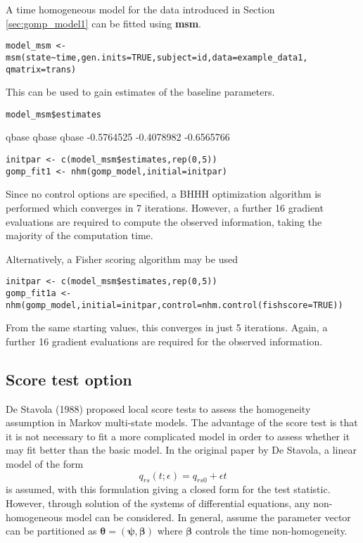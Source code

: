 \documentclass{article}
\numberwithin{equation}{section}
\begin{document}
A time homogeneous model for the data introduced in Section \ref{sec:gomp_model1} can be fitted using {\bf msm}.

\begin{verbatim}
model_msm <- msm(state~time,gen.inits=TRUE,subject=id,data=example_data1,
qmatrix=trans)
\end{verbatim}
This can be used to gain estimates of the baseline parameters.
\begin{verbatim}
model_msm$estimates
\end{verbatim}
\begin{verbout}
     qbase      qbase      qbase
-0.5764525 -0.4078982 -0.6565766
\end{verbout}

\begin{verbatim}
initpar <- c(model_msm$estimates,rep(0,5))
gomp_fit1 <- nhm(gomp_model,initial=initpar)
\end{verbatim}
Since no control options are specified, a BHHH optimization algorithm is performed which converges in 7 iterations. However, a further 16 gradient evaluations are required to compute the observed information, taking the majority of the computation time.

Alternatively, a Fisher scoring algorithm may be used
\begin{verbatim}
initpar <- c(model_msm$estimates,rep(0,5))
gomp_fit1a <- nhm(gomp_model,initial=initpar,control=nhm.control(fishscore=TRUE))
\end{verbatim}
From the same starting values, this converges in just 5 iterations. Again, a further 16 gradient evaluations are required for the observed information.

\subsection{Score test option}
\label{sec:scoretest}

De Stavola (1988) \cite{stavola} proposed local score tests to assess the homogeneity assumption in Markov multi-state models. The advantage of the score test is that it is not necessary to fit a more complicated model in order to assess whether it may fit better than the basic model. In the original paper by De Stavola, a linear model of the form
$$q_{rs}(t; \epsilon) = q_{rs0} + \epsilon t$$
is assumed, with this formulation giving a closed form for the test statistic. However, through solution of the systems of differential equations, any non-homogeneous model can be considered. In general, assume the parameter vector can be partitioned as $\bm\theta = (\bm\psi , \bm\beta)$ where $\bm\beta$ controls the time non-homogeneity.
\end{document}
